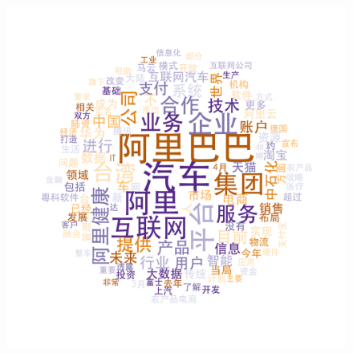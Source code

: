 \documentclass{beamer}
\begin{document}
\begin{frame}
\begin{figure}
    \includegraphics[height=0.3\textheight]{plot/Mar-Apr-wordcloud.png}\\

\end{figure}
\end{frame}
\end{document}
